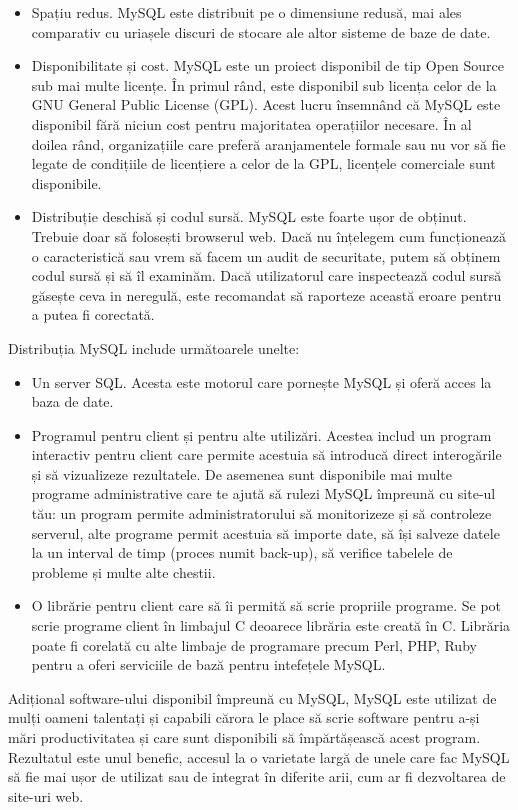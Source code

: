 \documentclass[12pt]{book}
\begin{document}
\begin{addmargin}[4em]{1em}
\begin{itemize}
	\item Spațiu redus. MySQL este distribuit pe o dimensiune redusă, mai ales comparativ cu uriașele discuri de stocare ale altor sisteme de baze de date.
	\item Disponibilitate și cost. MySQL este un proiect disponibil de tip Open Source sub mai multe licențe. În primul rând, este disponibil sub licența celor de la GNU General Public License (GPL). Acest lucru însemnând că MySQL este disponibil fără niciun cost pentru majoritatea operațiilor necesare. În al doilea rând, organizațiile care preferă aranjamentele formale sau nu vor să fie legate de condițiile de licențiere a celor de la GPL, licențele comerciale sunt disponibile.
	\item Distribuție deschisă și codul sursă. MySQL este foarte ușor de obținut. Trebuie doar să folosești browserul web. Dacă nu înțelegem cum funcționează o caracteristică sau vrem să facem un audit de securitate, putem să obținem codul sursă și să îl examinăm. Dacă utilizatorul care inspectează codul sursă găsește ceva in neregulă, este recomandat să raporteze această eroare pentru a putea fi corectată.
\end{itemize}
\end{addmargin}
\bigbreak
Distribuția MySQL include următoarele unelte:
\begin{addmargin}[4em]{1em}
\begin{itemize}
\item Un server SQL. Acesta este motorul care pornește MySQL și oferă acces la baza de date.
\item Programul pentru client și pentru alte utilizări. Acestea includ un program interactiv pentru client care permite acestuia să introducă direct interogările și să vizualizeze rezultatele. De asemenea sunt disponibile mai multe programe administrative care te ajută să rulezi MySQL împreună cu site-ul tău: un program permite administratorului să monitorizeze și să controleze serverul, alte programe permit acestuia să importe date, să își salveze datele la un interval de timp (proces numit back-up), să verifice tabelele de probleme și multe alte chestii.
\item O librărie pentru client care să îi permită să scrie propriile programe. Se pot scrie programe client în limbajul C deoarece librăria este creată în C. Librăria poate fi corelată cu alte limbaje de programare precum Perl, PHP, Ruby pentru a oferi serviciile de bază pentru intefețele MySQL.
\end{itemize}
\end{addmargin}
\bigbreak
Adițional software-ului disponibil împreună cu MySQL, MySQL este utilizat de mulți oameni talentați și capabili cărora le place să scrie software pentru a-și mări productivitatea și care sunt disponibili să împărtășească acest program. Rezultatul este unul benefic, accesul la o varietate largă de unele care fac MySQL să fie mai ușor de utilizat sau de integrat în diferite arii, cum ar fi dezvoltarea de site-uri web. 
\end{document}
